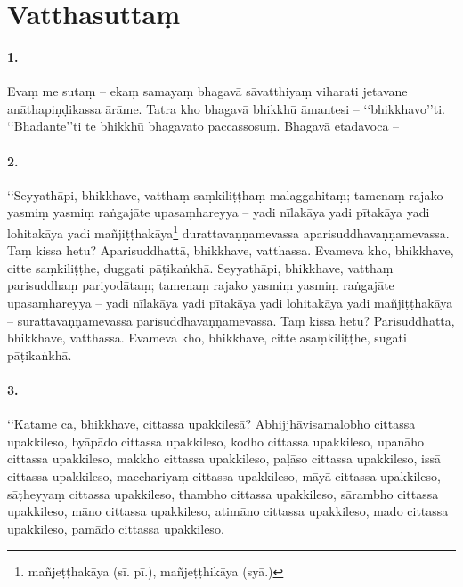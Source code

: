 \section{Vatthasuttaṃ}

\paragraph{1.}  Evaṃ me sutaṃ – ekaṃ samayaṃ bhagavā sāvatthiyaṃ viharati jetavane anāthapiṇḍikassa ārāme. Tatra kho bhagavā bhikkhū āmantesi – ‘‘bhikkhavo’’ti. ‘‘Bhadante’’ti te bhikkhū bhagavato paccassosuṃ. Bhagavā etadavoca –

\paragraph{2.} ‘‘Seyyathāpi, bhikkhave, vatthaṃ saṃkiliṭṭhaṃ malaggahitaṃ; tamenaṃ rajako yasmiṃ yasmiṃ raṅgajāte upasaṃhareyya – yadi nīlakāya yadi pītakāya yadi lohitakāya yadi mañjiṭṭhakāya\footnote{mañjeṭṭhakāya (sī. pī.), mañjeṭṭhikāya (syā.)} durattavaṇṇamevassa aparisuddhavaṇṇamevassa. Taṃ kissa hetu? Aparisuddhattā, bhikkhave, vatthassa. Evameva kho, bhikkhave, citte saṃkiliṭṭhe, duggati pāṭikaṅkhā. Seyyathāpi, bhikkhave, vatthaṃ parisuddhaṃ pariyodātaṃ; tamenaṃ rajako yasmiṃ yasmiṃ raṅgajāte upasaṃhareyya – yadi nīlakāya yadi pītakāya yadi lohitakāya yadi mañjiṭṭhakāya – surattavaṇṇamevassa parisuddhavaṇṇamevassa. Taṃ kissa hetu? Parisuddhattā, bhikkhave, vatthassa. Evameva kho, bhikkhave, citte asaṃkiliṭṭhe, sugati pāṭikaṅkhā.

\paragraph{3.} ‘‘Katame ca, bhikkhave, cittassa upakkilesā? Abhijjhāvisamalobho cittassa upakkileso, byāpādo cittassa upakkileso, kodho cittassa upakkileso, upanāho cittassa upakkileso, makkho cittassa upakkileso, paḷāso cittassa upakkileso, issā cittassa upakkileso, macchariyaṃ cittassa upakkileso, māyā cittassa upakkileso, sāṭheyyaṃ cittassa upakkileso, thambho cittassa upakkileso, sārambho cittassa upakkileso, māno cittassa upakkileso, atimāno cittassa upakkileso, mado cittassa upakkileso, pamādo cittassa upakkileso.

